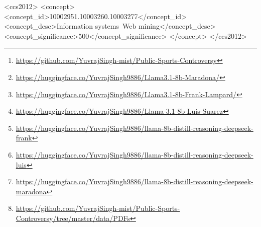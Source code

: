 \documentclass[sigconf, review]{acmart}
\begin{document}
\begin{abstract}
  This paper presents an analysis of YouTube comments on famous and controversial Public Sports Events. We explore public sentiment analysis (stance detection) on a total of 6 famous controversial sports incidents by extracting and processing YouTube comments. Stance detection is performed on those events through fine-tuning of models like Llama-3.1-8b and Deepseek reasoning models (Llama-8b distilled) on hand-curated examples like \textit{The Underarm Incident}, \textit{Jonny Bairstow's Run-Out} Incident, \textit{Ashwin's Mankadding} Event, \textit{Luis Suarez Handball} Event etc. Our code is available \footnote{\url{https://github.com/YuvrajSingh-mist/Public-Sports-Controversy}}
The complete event details,  results and evaluation metrics will be discussed in detail in subsequent sections. 
Our models can be found here \footnote{\url{https://huggingface.co/YuvrajSingh9886/Llama3.1-8b-Maradona/}} \footnote{\url{https://huggingface.co/YuvrajSingh9886/Llama3.1-8b-Frank-Lampard/}} \footnote{\url{https://huggingface.co/YuvrajSingh9886/Llama-3.1-8b-Luis-Suarez}}. 
\footnote{\url{https://huggingface.co/YuvrajSingh9886/llama-8b-distill-reasoning-deepseek-frank}}
\footnote{\url{https://huggingface.co/YuvrajSingh9886/llama-8b-distill-reasoning-deepseek-luis}}
\footnote{\url{https://huggingface.co/YuvrajSingh9886/llama-8b-distill-reasoning-deepseek-maradona}} Our entire pipeline can be found here \footnote{\url{https://github.com/YuvrajSingh-mist/Public-Sports-Controversy/tree/master/data/PDFs}}
       
  

\end{abstract}


\begin{CCSXML}
<ccs2012>
   <concept>
       <concept_id>10002951.10003260.10003277</concept_id>
       <concept_desc>Information systems~Web mining</concept_desc>
       <concept_significance>500</concept_significance>
       </concept>
 </ccs2012>
\end{CCSXML}



\maketitle
\end{document}
